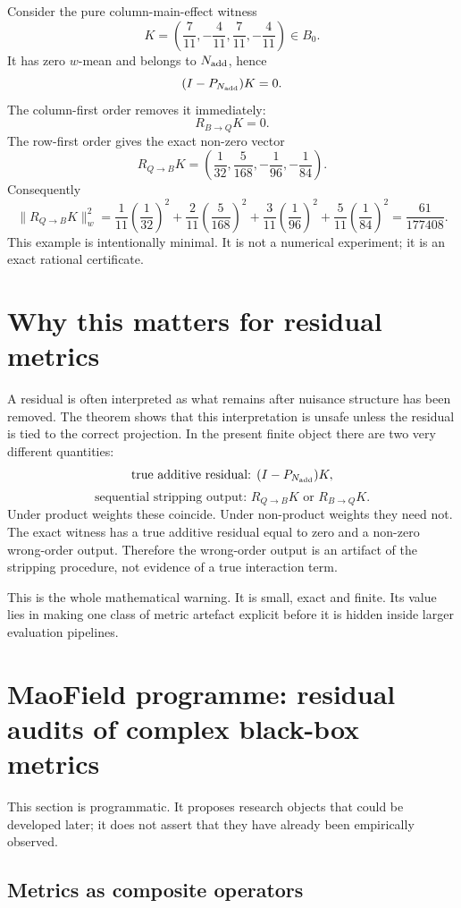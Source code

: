 \documentclass[11pt]{article}
\theoremstyle{remark}
\newcommand{\RQBt}{R_{Q\to B}}
\newcommand{\RBQt}{R_{B\to Q}}
\begin{document}
Consider the pure column-main-effect witness
\[
K=\left(\frac7{11},-\frac4{11},\frac7{11},-\frac4{11}\right)\in B_0.
\]
It has zero $w$-mean and belongs to $N_{\rm add}$, hence
\[
(I-P_{N_{\rm add}})K=0.
\]
The column-first order removes it immediately:
\[
\RBQt K=0.
\]
The row-first order gives the exact non-zero vector
\[
\RQBt K=
\left(\frac1{32},\frac5{168},-\frac1{96},-\frac1{84}\right).
\]
Consequently
\[
\|\RQBt K\|_w^2
=\frac1{11}\left(\frac1{32}\right)^2
+\frac2{11}\left(\frac5{168}\right)^2
+\frac3{11}\left(\frac1{96}\right)^2
+\frac5{11}\left(\frac1{84}\right)^2
=\frac{61}{177408}.
\]
This example is intentionally minimal. It is not a numerical experiment; it is an exact rational certificate.

\section{Why this matters for residual metrics}

A residual is often interpreted as what remains after nuisance structure has been removed. The theorem shows that this interpretation is unsafe unless the residual is tied to the correct projection. In the present finite object there are two very different quantities:
\[
\text{true additive residual: }(I-P_{N_{\rm add}})K,
\]
\[
\text{sequential stripping output: }\RQBt K\text{ or }\RBQt K.
\]
Under product weights these coincide. Under non-product weights they need not. The exact witness has a true additive residual equal to zero and a non-zero wrong-order output. Therefore the wrong-order output is an artifact of the stripping procedure, not evidence of a true interaction term.

This is the whole mathematical warning. It is small, exact and finite. Its value lies in making one class of metric artefact explicit before it is hidden inside larger evaluation pipelines.

\section{MaoField programme: residual audits of complex black-box metrics}

This section is programmatic. It proposes research objects that could be developed later; it does not assert that they have already been empirically observed.

\subsection{Metrics as composite operators}
\end{document}
